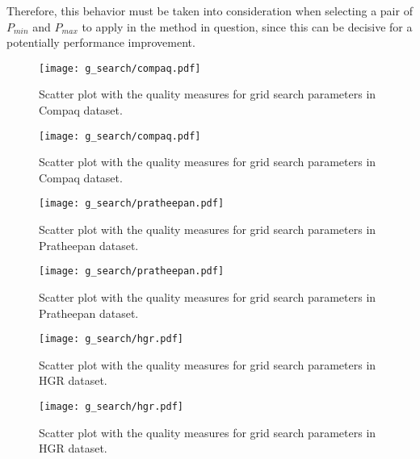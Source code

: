 Therefore, this behavior must be taken into consideration when selecting a pair of $P_{min}$ and $P_{max}$ to apply in the method in question, since this can be decisive for a potentially performance improvement.

\clearpage %

\begin{figure}[!htb]
    \centering
    \texttt{[image: g\_search/compaq.pdf]}

    \caption{Scatter plot with the quality measures for grid search parameters in Compaq dataset.}
\end{figure}
\begin{figure}[!htb]
    \ContinuedFloat
    \centering
    \texttt{[image: g\_search/compaq.pdf]}

    \caption{Scatter plot with the quality measures for grid search parameters in Compaq dataset.}
    \label{fig:compaq_g_search}
\end{figure}


\begin{figure}[!htb]
    \centering
    \texttt{[image: g\_search/pratheepan.pdf]}

    \caption{Scatter plot with the quality measures for grid search parameters in Pratheepan dataset.}
\end{figure}
\begin{figure}[!htb]
    \ContinuedFloat
    \centering
    \texttt{[image: g\_search/pratheepan.pdf]}

    \caption{Scatter plot with the quality measures for grid search parameters in Pratheepan dataset.}
    \label{fig:pratheepan_g_search}
\end{figure}


\begin{figure}[!htb]
    \centering
    \texttt{[image: g\_search/hgr.pdf]}

    \caption{Scatter plot with the quality measures for grid search parameters in HGR dataset.}
\end{figure}
\begin{figure}[!htb]
    \ContinuedFloat
    \centering
    \texttt{[image: g\_search/hgr.pdf]}

    \caption{Scatter plot with the quality measures for grid search parameters in HGR dataset.}
    \label{fig:hgr_g_search}
\end{figure}


